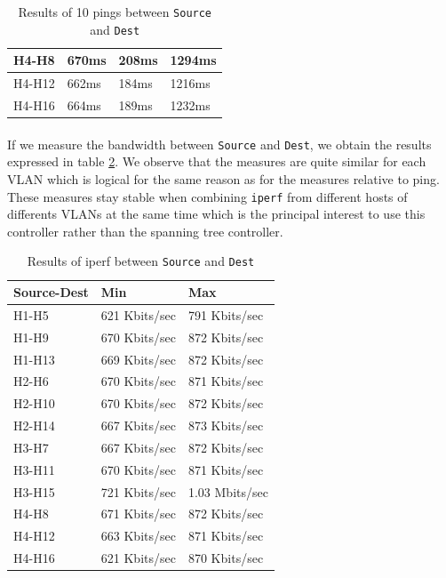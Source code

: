 \documentclass[a4paper, 11pt, oneside]{article}
\begin{document}
\begin{table}[H]
\begin{tabular}{|l|l|l|l|}
    H4-H8                                    & 670ms                              & 208ms                              & 1294ms                                 \\ \hline
    H4-H12                                     & 662ms                              & 184ms                              & 1216ms                                 \\ \hline
    H4-H16                                     & 664ms                              & 189ms                              & 1232ms                                 \\ \hline
    \end{tabular}
    \caption{Results of 10 pings between \texttt{Source} and \texttt{Dest}}
    \label{table:VLANs_pings}
    \end{table}

\paragraph{}If we measure the bandwidth between \texttt{Source} and \texttt{Dest}, we obtain the results expressed in table \ref{table:VLANs_bw}. We observe that the measures are quite similar for each VLAN which is logical for the same reason as for the measures relative to ping. These measures stay stable when combining \texttt{iperf} from different hosts of differents VLANs at the same time which is the principal interest to use this controller rather than the spanning tree controller.
\begin{table}[H]
    \centering
    \begin{tabular}{|l|l|l|}
    \hline
    \textbf{Source-Dest} & \textbf{Min}  & \textbf{Max}   \\ \hline
    H1-H5                & 621 Kbits/sec & 791 Kbits/sec  \\ \hline
    H1-H9                & 670 Kbits/sec & 872 Kbits/sec  \\ \hline
    H1-H13               & 669 Kbits/sec & 872 Kbits/sec  \\ \hline
    H2-H6                & 670 Kbits/sec & 871 Kbits/sec  \\ \hline
    H2-H10               & 670 Kbits/sec & 872 Kbits/sec  \\ \hline
    H2-H14               & 667 Kbits/sec & 873 Kbits/sec  \\ \hline
    H3-H7                & 667 Kbits/sec & 872 Kbits/sec  \\ \hline
    H3-H11               & 670 Kbits/sec & 871 Kbits/sec  \\ \hline
    H3-H15               & 721 Kbits/sec & 1.03 Mbits/sec \\ \hline
    H4-H8                & 671 Kbits/sec & 872 Kbits/sec  \\ \hline
    H4-H12               & 663 Kbits/sec & 871 Kbits/sec  \\ \hline
    H4-H16               & 621 Kbits/sec & 870 Kbits/sec  \\ \hline
    \end{tabular}
    \caption{Results of iperf between \texttt{Source} and \texttt{Dest}}
    \label{table:VLANs_bw}
    \end{table}
\end{document}
